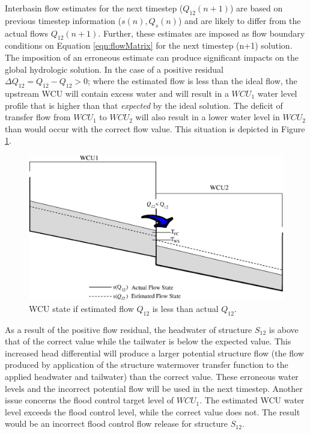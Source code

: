 Interbasin flow estimates for the next timestep ($Q_{12}(n + 1)$) are
based on previous timestep information ($s(n),Q_s(n)$) and are likely
to differ from the actual flows $Q_{12}(n + 1)$. Further, these
estimates are imposed as flow boundary conditions on Equation
\ref{eqn:flowMatrix} for the next timestep (n+1) solution. The
imposition of an erroneous estimate can produce significant impacts on
the global hydrologic solution. In the case of a positive residual
$\Delta Q_{12} = Q_{12} - Q_{12} > 0$; where the estimated flow is
less than the ideal flow, the upstream WCU will contain excess water
and will result in a $WCU_1$ water level profile that is higher than
that \emph{expected} by the ideal solution. The deficit of transfer
flow from $WCU_1$ to $WCU_2$ will also result in a lower water level
in $WCU_2$ than would occur with the correct flow value. This
situation is depicted in Figure \ref{fig:wcusCoupled_1}.

 \begin{figure}
 \begin{center}
  \includegraphics[scale=.33]{Graphics/wcusCoupled_1.eps}
 \end{center}
 \caption{\label{fig:wcusCoupled_1} WCU state if estimated flow $Q_{12}$ is less than actual $Q_{12}$.}
\end{figure}

As a result of the positive flow residual, the headwater of structure
$S_{12}$ is above that of the correct value while the tailwater is
below the expected value. This increased head differential will
produce a larger potential structure flow (the flow produced by
application of the structure watermover transfer function to the
applied headwater and tailwater) than the correct value. These
erroneous water levels and the incorrect potential flow will be used
in the next timestep. Another issue concerns the flood control target
level of $WCU_1$. The estimated WCU water level exceeds the flood
control level, while the correct value does not. The result would be
an incorrect flood control flow release for structure $S_{12}$.

